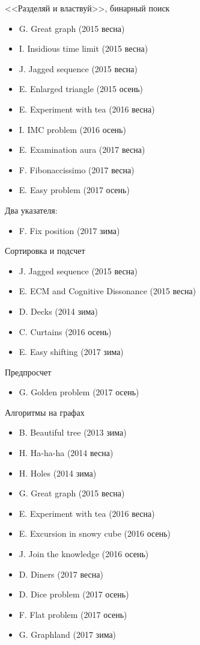 <<Разделяй и властвуй>>, бинарный поиск
\begin{itemize}
\item G. Great graph (2015 весна)
\item I. Insidious time limit (2015 весна)
\item J. Jagged sequence (2015 весна)
\item E. Enlarged triangle (2015 осень)
\item E. Experiment with tea (2016 весна)
\item I. IMC problem (2016 осень)
\item E. Examination aura (2017 весна)
\item F. Fibonaccissimo (2017 весна)
\item E. Easy problem (2017 осень)
\end{itemize}

Два указателя:
\begin{itemize}
\item F. Fix position (2017 зима)
\end{itemize}

Сортировка и подсчет 
\begin{itemize}
\item J. Jagged sequence (2015 весна)
\item E. ECM and Cognitive Dissonance (2015 весна)
\item D. Decks (2014 зима)
\item C. Curtains (2016 осень)
\item E. Easy shifting (2017 зима)
\end{itemize}

Предпросчет
\begin{itemize}
\item G. Golden problem (2017 осень)
\end{itemize}

Алгоритмы на графах
\begin{itemize}
\item B. Beautiful tree (2013 зима)
\item H. Ha-ha-ha (2014 весна)
\item H. Holes (2014 зима)
\item G. Great graph (2015 весна)
\item E. Experiment with tea (2016 весна)
\item E. Excursion in snowy cube (2016 осень)
\item J. Join the knowledge (2016 осень)
\item D. Diners (2017 весна)
\item D. Dice problem (2017 осень)
\item F. Flat problem (2017 осень)
\item G. Graphland (2017 зима)
\end{itemize}

